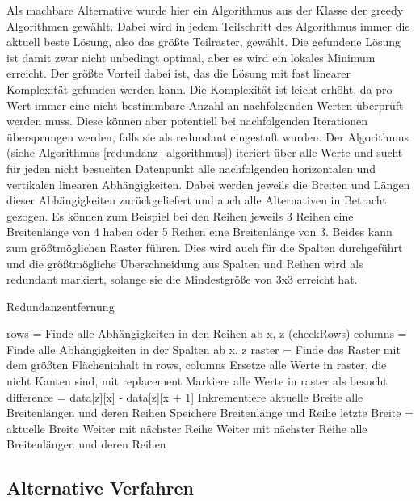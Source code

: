 Als machbare Alternative wurde hier ein Algorithmus aus der Klasse der greedy Algorithmen gewählt. Dabei wird in jedem Teilschritt des Algorithmus immer die aktuell beste Lösung, also das größte Teilraster, gewählt. Die gefundene Lösung ist damit zwar nicht unbedingt optimal, aber es wird ein lokales Minimum erreicht. Der größte Vorteil dabei ist, das die Lösung mit fast linearer Komplexität gefunden werden kann. Die Komplexität ist leicht erhöht, da pro Wert immer eine nicht bestimmbare Anzahl an nachfolgenden Werten überprüft werden muss. Diese können aber potentiell bei nachfolgenden Iterationen übersprungen werden, falls sie als redundant eingestuft wurden. Der Algorithmus (siehe Algorithmus \ref{redundanz_algorithmus}) iteriert über alle Werte und sucht für jeden nicht besuchten Datenpunkt alle nachfolgenden horizontalen und vertikalen linearen Abhängigkeiten. Dabei werden jeweils die Breiten und Längen dieser Abhängigkeiten zurückgeliefert und auch alle Alternativen in Betracht gezogen. Es können zum Beispiel bei den Reihen jeweils 3 Reihen eine Breitenlänge von 4 haben oder 5 Reihen eine Breitenlänge von 3. Beides kann zum größtmöglichen Raster führen. Dies wird auch für die Spalten durchgeführt und die größtmögliche Überschneidung aus Spalten und Reihen wird als redundant markiert, solange sie die Mindestgröße von 3x3 erreicht hat.

\begin{algorithm}[H]
\begin{algorithmic}
\caption{Redundanzentfernung}
\label{redundanz_algorithmus}
            \State rows = Finde alle Abhängigkeiten in den Reihen ab x, z (checkRows)
            \State columns = Finde alle Abhängigkeiten in der Spalten ab x, z
            \State raster = Finde das Raster mit dem größten Flächeninhalt in rows, columns
                \State Ersetze alle Werte in raster, die nicht Kanten sind, mit replacement
                \State Markiere alle Werte in raster als besucht
            \EndIf
        \EndIf     
    \EndFor
\EndProcedure
{}
        \State difference = data[z][x] - data[z][x + 1]
                \State Inkrementiere aktuelle Breite
                \State\Return alle Breitenlängen und deren Reihen
                \State Speichere Breitenlänge und Reihe
                \State letzte Breite = aktuelle Breite
                \State Weiter mit nächster Reihe
            \Else
                \State Weiter mit nächster Reihe
            \EndIf
        \EndFor
    \EndFor
    \State\Return alle Breitenlängen und deren Reihen
\EndProcedure
\end{algorithmic}
\end{algorithm}

\subsection{Alternative Verfahren}

